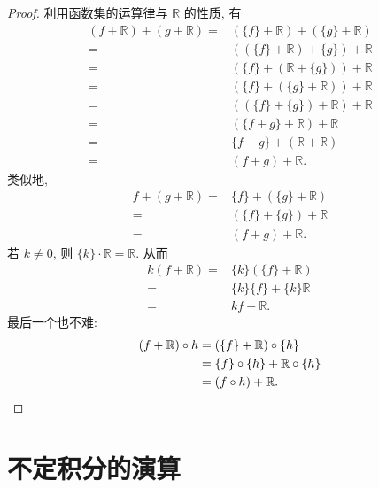 \begin{proof}
    利用函数集的运算律与 $\mathbb{R}$ 的性质, 有
    \begin{align*}
        (f + \mathbb{R}) + (g + \mathbb{R})
        = {} & (\{ f \} + \mathbb{R}) + (\{ g \} + \mathbb{R}) \\
        = {} & ((\{ f \} + \mathbb{R}) + \{ g \}) + \mathbb{R} \\
        = {} & (\{ f \} + (\mathbb{R} + \{ g \})) + \mathbb{R} \\
        = {} & (\{ f \} + (\{ g \} + \mathbb{R})) + \mathbb{R} \\
        = {} & ((\{ f \} + \{ g \}) + \mathbb{R}) + \mathbb{R} \\
        = {} & (\{ f + g \} + \mathbb{R}) + \mathbb{R}         \\
        = {} & \{ f + g \} + (\mathbb{R} + \mathbb{R})         \\
        = {} & (f + g) + \mathbb{R}.
    \end{align*}
    类似地,
    \begin{align*}
        f + (g + \mathbb{R})
        = {} & \{ f \} + (\{ g \} + \mathbb{R}) \\
        = {} & (\{ f \} + \{ g \}) + \mathbb{R} \\
        = {} & (f + g) + \mathbb{R}.
    \end{align*}
    若 $k \neq 0$, 则 $\{ k \} \cdot \mathbb{R} = \mathbb{R}$. 从而
    \begin{align*}
        k(f + \mathbb{R})
        = {} & \{ k \} ( \{ f \} + \mathbb{R} )     \\
        = {} & \{ k \} \{ f \} + \{ k \} \mathbb{R} \\
        = {} & kf + \mathbb{R}.
    \end{align*}
    最后一个也不难:
    \begin{align*}
        (f + \mathbb{R}) \circ h
        = {} & (\{ f \} + \mathbb{R}) \circ \{ h \}             \\
        = {} & \{ f \} \circ \{ h \} + \mathbb{R} \circ \{ h \} \\
        = {} & ( f \circ h ) + \mathbb{R}. \qedhere
    \end{align*}
\end{proof}

\section{不定积分的演算}

